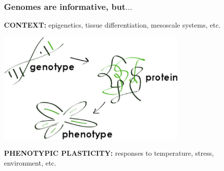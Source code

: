 %
\begin{frame}
  \frametitle{Genomes are informative, but$\ldots$}
  \textcolor{hutton_blue}{\textbf{CONTEXT:}} epigenetics, tissue differentiation, mesoscale systems, etc.\\
  \begin{center}  
    \includegraphics[width=0.7\textwidth]{images/genotype_protein_phenotype}
  \end{center}    
  \textcolor{hutton_green}{\textbf{PHENOTYPIC PLASTICITY:}} responses to temperature, stress, environment, etc.
\end{frame}

